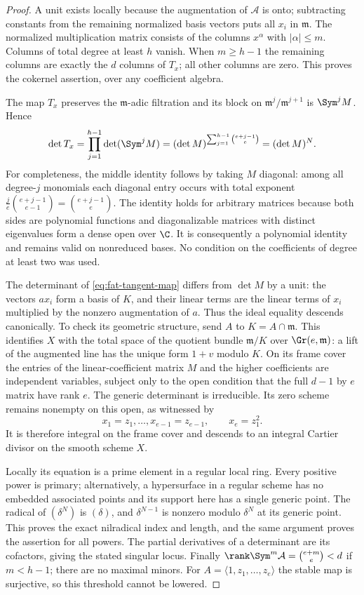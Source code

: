 \begin{proof}
A unit exists locally because the augmentation of $\mathcal A$ is
onto; subtracting constants from the remaining normalized basis
vectors puts all $x_i$ in $\mathfrak m$. The normalized multiplication
matrix consists of the columns $x^\alpha$ with $|\alpha|\le m$.
Columns of total degree at least $h$ vanish. When $m\ge h-1$ the
remaining columns are exactly the $d$ columns of $T_x$; all other
columns are zero. This proves the cokernel assertion, over any
coefficient algebra.

The map $T_x$ preserves the $\mathfrak m$-adic filtration and its
block on $\mathfrak m^j/\mathfrak m^{j+1}$ is $\Sym^j M$. Hence
\[
 \det T_x=\prod_{j=1}^{h-1}\det(\Sym^j M)
          =(\det M)^{\sum_{j=1}^{h-1}\binom{e+j-1}{e}}
          =(\det M)^N.
\]
For completeness, the middle identity follows by taking $M$ diagonal:
among all degree-$j$ monomials each diagonal entry occurs with total
exponent $\frac je\binom{e+j-1}{e-1}=\binom{e+j-1}{e}$.
The identity holds for arbitrary matrices because both sides are
polynomial functions and diagonalizable matrices with distinct
eigenvalues form a dense open over $\C$. It is consequently a
polynomial identity and remains valid on nonreduced bases.
No condition on the coefficients of degree at least two was used.

The determinant of \eqref{eq:fat-tangent-map} differs from $\det M$
by a unit: the vectors $ax_i$ form a basis of $K$, and their linear
terms are the linear terms of $x_i$ multiplied by the nonzero
augmentation of $a$. Thus the ideal equality descends canonically.
To check its geometric structure, send $A$ to $K=A\cap\mathfrak m$.
This identifies $X$ with the total space of the quotient bundle
$\mathfrak m/K$ over $\Gr(e,\mathfrak m)$: a lift of the augmented
line has the unique form $1+v$ modulo $K$. On its frame cover the
entries of the linear-coefficient matrix $M$ and the higher
coefficients are independent variables, subject only to the open
condition that the full $d-1$ by $e$ matrix have rank $e$.
The generic determinant is irreducible. Its zero scheme remains
nonempty on this open, as witnessed by
\[
 x_1=z_1,\ldots,x_{e-1}=z_{e-1},\qquad x_e=z_1^2.
\]
It is therefore integral on the frame cover and descends to an
integral Cartier divisor on the smooth scheme $X$.

Locally its equation is a prime element in a regular local ring.
Every positive power is primary; alternatively, a hypersurface in
a regular scheme has no embedded associated points and its support
here has a single generic point. The radical of $(\delta^N)$ is
$(\delta)$, and $\delta^{N-1}$ is nonzero modulo $\delta^N$ at its
generic point. This proves the exact nilradical index and length,
and the same argument proves the assertion for all powers.
The partial derivatives of a determinant are its cofactors, giving
the stated singular locus.
Finally $\rank\Sym^m\mathcal A=\binom{e+m}{e}<d$ if $m<h-1$;
there are no maximal minors. For $A=\langle1,z_1,\ldots,z_e\rangle$
the stable map is surjective, so this threshold cannot be lowered.
\end{proof}

